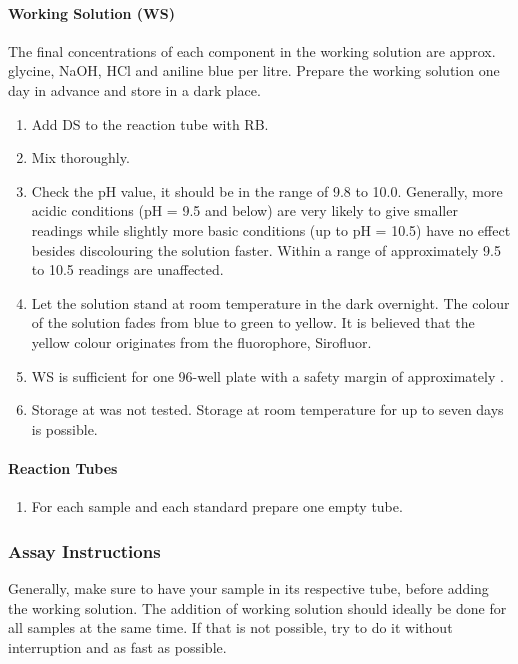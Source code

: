 \paragraph{Working Solution (WS)}
The final concentrations of each component in the working solution are approx.  glycine,  NaOH,  HCl and  aniline blue per litre. Prepare the working solution one day in advance and store in a dark place.
\begin{enumerate}
	\setcounter{enumi}{\value{sirofluor-protocol}}
	\item Add  DS to the reaction tube with  RB.
	\item Mix thoroughly.
	\item Check the pH value, it should be in the range of 9.8 to 10.0. Generally, more acidic conditions (pH = 9.5 and below) are very likely to give smaller readings while slightly more basic conditions (up to pH = 10.5) have no effect besides discolouring the solution faster. Within a range of approximately 9.5 to 10.5 readings are unaffected.
	\item Let the solution stand at room temperature in the dark overnight. The colour of the solution fades from blue to green to yellow. It is believed that the yellow colour originates from the fluorophore, Sirofluor.
	\item {} WS is sufficient for one 96-well plate with a safety margin of approximately .
	\item Storage at  was not tested. Storage at room temperature for up to seven days is possible.
	\setcounter{sirofluor-protocol}{\value{enumi}}
\end{enumerate}

\paragraph{Reaction Tubes}
\begin{enumerate}
	\setcounter{enumi}{\value{sirofluor-protocol}}
	\item For each sample and each standard prepare one empty  tube.
	\setcounter{sirofluor-protocol}{\value{enumi}}
\end{enumerate}

\subsubsection{Assay Instructions}
Generally, make sure to have your sample in its respective tube, before adding the working solution. The addition of working solution should ideally be done for all samples at the same time. If that is not possible, try to do it without interruption and as fast as possible.
